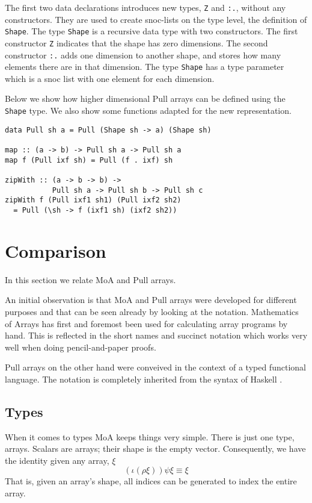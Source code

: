 \documentclass{sigplanconf}
\begin{document}
The first two data declarations introduces new types, \verb!Z! and
\verb!:.!, without any constructors. They are used to create
snoc-lists on the type level, the definition of \verb!Shape!.  The
type \verb!Shape! is a recursive data type with two constructors. The
first constructor \verb!Z! indicates that the shape has zero
dimensions.  The second constructor \verb!:.! adds one dimension to
another shape, and stores how many elements there are in that
dimension. The type \verb!Shape! has a type parameter which is a snoc
list with one element for each dimension.

Below we show how higher dimensional Pull arrays can be defined using
the \verb!Shape! type. We also show some functions adapted for the new
representation.
\begin{verbatim}
data Pull sh a = Pull (Shape sh -> a) (Shape sh)

map :: (a -> b) -> Pull sh a -> Pull sh a
map f (Pull ixf sh) = Pull (f . ixf) sh

zipWith :: (a -> b -> b) -> 
           Pull sh a -> Pull sh b -> Pull sh c
zipWith f (Pull ixf1 sh1) (Pull ixf2 sh2)
  = Pull (\sh -> f (ixf1 sh) (ixf2 sh2))
\end{verbatim}


\section{Comparison}

In this section we relate MoA and Pull arrays. 

An initial observation is that MoA and Pull arrays were developed for
different purposes and that can be seen already by looking at the
notation. Mathematics of Arrays has first and foremost been used for
calculating array programs by hand. This is reflected in the short
names and succinct notation which works very well when doing
pencil-and-paper proofs.

Pull arrays on the other hand were conveived in the context of a
typed functional language. The notation is completely inherited from
the syntax of Haskell \cite{marlow2010haskell}.

\subsection{Types}
\label{sec:types}

When it comes to types MoA keeps things very simple. There is just one
type, arrays.  Scalars are arrays;  their shape is the empty vector. Consequently, we have the identity given any array, $\xi$
\[( \iota (\rho \xi)  )\psi \xi \equiv \xi\]
That is, given an array's shape, all indices can be generated to index the entire array.
\end{document}
